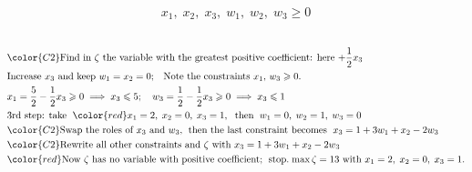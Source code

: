 \documentclass[usenames,dvipsnames,8pt]{beamer}%
\begin{document}
\begin{frame}
\begin{columns}
\begin{column}{0.5\textwidth}
      \begin{align*}
        x_1,\;x_2,\;x_3,\;w_1,\;w_2,\;w_3\geqslant 0
      \end{align*}
    \end{column}
  \end{columns}
  \begin{align*}
    &{\color{C2}\text{Find in $\zeta$ the variable with the greatest positive coefficient: here $+\frac{1}{2} x_3$}} \\
    &\text{Increase $x_3$ and keep $w_1 = x_2 = 0$;\quad Note the constraints $x_1,\,w_3\geqslant 0$.} \\
    &x_1 = \frac{5}{2}-\frac{1}{2}x_3\geqslant 0\;\Longrightarrow\; x_3\leqslant 5;\quad w_3 = \frac{1}{2}-\frac{1}{2}x_3\geqslant 0\;\Longrightarrow\; x_3\leqslant 1\\
    &\text{3rd step: take }\;{\color{red}x_1 = 2,\; x_2 = 0,\; x_3 = 1},\;\text{ then }\;w_1 = 0,\;w_2 = 1,\;w_3 = 0\\
    &{\color{C2}\text{Swap the roles of $x_3$ and $w_3$,\;\text{ then the last constraint becomes }\;$x_3 = 1 + 3 w_1 + x_2 - 2 w_3$ }} \\
    &{\color{C2}\text{Rewrite all other constraints and $\zeta$ with $x_3 = 1 + 3 w_1 + x_2-2 w_3$}}\\ 
    &{\color{red}\text{Now $\zeta$ has no variable with positive coefficient;\; stop.\;$\max\zeta = 13$ with $x_1 = 2,\; x_2 = 0,\; x_3 = 1$.}} 
  \end{align*}
\end{frame}
\end{document}
